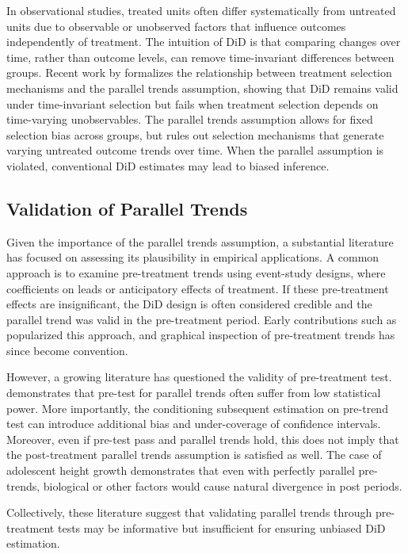 \documentclass[12pt]{article}
\begin{document}
In observational studies, treated units often differ systematically from untreated units due to observable or unobserved factors that influence outcomes independently of treatment. The intuition of DiD is that comparing changes over time, rather than outcome levels, can remove  time-invariant differences between groups.
Recent work by \cite{ghanem_selection_2026}  formalizes the relationship between treatment selection mechanisms and the parallel trends assumption, showing that DiD remains valid under time-invariant selection but fails when treatment selection depends on time-varying unobservables. The parallel trends assumption allows for fixed selection bias across groups, but rules out selection mechanisms that generate varying untreated outcome trends over time. When the parallel assumption is violated, conventional DiD estimates may lead to biased inference.

\subsection{Validation of Parallel Trends}

Given the importance of the parallel trends assumption, a substantial literature has focused on assessing its plausibility in empirical applications. A common approach is to examine pre-treatment trends using event-study designs, where coefficients on leads or anticipatory effects of treatment. If these pre-treatment effects are insignificant, the DiD design is often considered credible and the parallel trend was valid in the pre-treatment period. Early contributions such as \cite{autor_outsourcing_2003} popularized this approach, and graphical inspection of pre-treatment trends has since become convention.

However, a growing literature has questioned the validity of pre-treatment test. \cite{roth_pretest_2022} demonstrates that pre-test for parallel trends often suffer from low statistical power. More importantly, the conditioning subsequent estimation on pre-trend test can introduce additional bias and under-coverage of confidence intervals. Moreover, even if pre-test pass and parallel trends hold, this does not imply that the post-treatment parallel trends assumption is satisfied as well. The case \cite{kahn-lang_promise_2020} of adolescent height growth demonstrates that even with perfectly parallel pre-trends, biological or other factors would cause natural divergence in post periods.

Collectively, these literature suggest that validating parallel trends through pre-treatment tests may be informative but insufficient for ensuring unbiased DiD estimation. 
\end{document}
